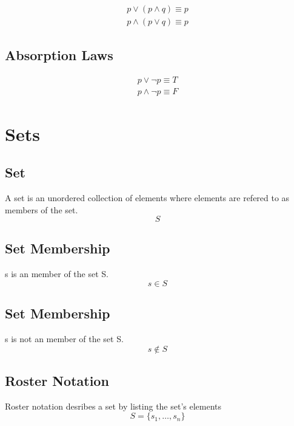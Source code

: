 \documentclass[12pt]{article}
\begin{document}
\begin{subequations}\label{absorption}
\begin{align}
p \lor (p \wedge q) \equiv p\label{absorb_first}\\
p \wedge (p \lor q) \equiv p\label{absorb_second}
\end{align}
\end{subequations}

\subsection{Absorption Laws}

\begin{subequations}\label{negation}
\begin{align}
p \lor \neg p\equiv T\label{neg_first}\\
p \wedge \neg p \equiv F\label{neg_second}
\end{align}
\end{subequations}


%
%
%
%
%
%
\pagebreak
\section{Sets}
\setcounter{equation}{0}

\subsection{Set}
A set is an unordered collection of elements where elements are refered to as members of the set.
\begin{equation}
S
\end{equation}

\subsection{Set Membership}
s is an member of the set S.
\begin{equation}
s \in S
\end{equation}

\subsection{Set Membership}
s is not an member of the set S.
\begin{equation}
s \not \in S
\end{equation}

\subsection{Roster Notation}
Roster notation desribes a set by listing the set's elements
\begin{equation}
S = \{s_1, \ldots, s_n\}
\end{equation}
\end{document}
